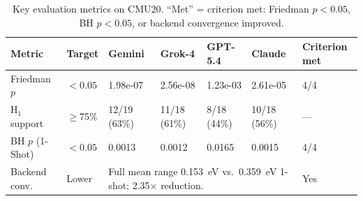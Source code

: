 \begin{table}[t]
\centering
\caption{Key evaluation metrics on CMU20. ``Met'' = criterion met: Friedman $p < 0.05$, BH $p < 0.05$, or backend convergence improved.}
\label{tab:key-evaluation-metrics}
\begin{tabular}{p{3.5cm}p{1.5cm}p{1.5cm}p{1.5cm}p{1.5cm}p{1.5cm}p{2.5cm}}
\toprule
Metric & Target & Gemini & Grok-4 & GPT-5.4 & Claude & Criterion met \\
\midrule
Friedman $p$~\cite{friedman1937use} & $< 0.05$ & 1.98e-07 & 2.56e-08 & 1.23e-03 & 2.61e-05 & 4/4 \\
H$_1$ support & $\geq$75\% & 12/19 (63\%) & 11/18 (61\%) & 8/18 (44\%) & 10/18 (56\%) & --- \\
BH $p$ (1-Shot)~\cite{benjamini1995controlling} & $< 0.05$ & 0.0013 & 0.0012 & 0.0165 & 0.0015 & 4/4 \\
Backend conv. & Lower & \multicolumn{4}{p{6.0cm}}{Full mean range 0.153~eV vs.\ 0.359~eV 1-shot; 2.35$\times$ reduction.} & Yes \\
\bottomrule
\end{tabular}
\end{table}

